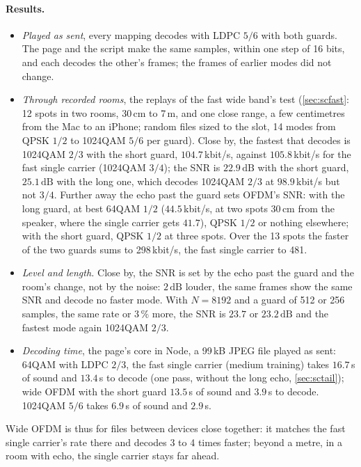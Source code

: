 \documentclass[11pt,a4paper]{article}
\newcommand{\dB}{\,\mathrm{dB}}
\theoremstyle{remark}
\begin{document}
\paragraph{Results.}
\begin{itemize}
\item \emph{Played as sent}, every mapping decodes with LDPC $5/6$ with both guards. The page and the script make the same samples, within one step of 16 bits, and each decodes the other's frames; the frames of earlier modes did not change.
\item \emph{Through recorded rooms}, the replays of the fast wide band's test (\cref{sec:scfast}: 12 spots in two rooms, 30\,cm to 7\,m, and one close range, a few centimetres from the Mac to an iPhone; random files sized to the slot, 14 modes from QPSK $1/2$ to 1024QAM $5/6$ per guard). Close by, the fastest that decodes is 1024QAM $2/3$ with the short guard, $104.7$\,kbit/s, against $105.8$\,kbit/s for the fast single carrier (1024QAM $3/4$); the SNR is $22.9\dB$ with the short guard, $25.1\dB$ with the long one, which decodes 1024QAM $2/3$ at $98.9$\,kbit/s but not $3/4$. Further away the echo past the guard sets OFDM's SNR: with the long guard, at best 64QAM $1/2$ ($44.5$\,kbit/s, at two spots 30\,cm from the speaker, where the single carrier gets $41.7$), QPSK $1/2$ or nothing elsewhere; with the short guard, QPSK $1/2$ at three spots. Over the 13 spots the faster of the two guards sums to 298\,kbit/s, the fast single carrier to 481.
\item \emph{Level and length.} Close by, the SNR is set by the echo past the guard and the room's change, not by the noise: $2\dB$ louder, the same frames show the same SNR and decode no faster mode. With $N = 8192$ and a guard of 512 or 256 samples, the same rate or $3\,\%$ more, the SNR is $23.7$ or $23.2\dB$ and the fastest mode again 1024QAM $2/3$.
\item \emph{Decoding time}, the page's core in Node, a 99\,kB JPEG file played as sent: 64QAM with LDPC $2/3$, the fast single carrier (medium training) takes $16.7$\,s of sound and $13.4$\,s to decode (one pass, without the long echo, \cref{sec:sctail}); wide OFDM with the short guard $13.5$\,s of sound and $3.9$\,s to decode. 1024QAM $5/6$ takes $6.9$\,s of sound and $2.9$\,s.
\end{itemize}
Wide OFDM is thus for files between devices close together: it matches the fast single carrier's rate there and decodes 3 to 4 times faster; beyond a metre, in a room with echo, the single carrier stays far ahead.
\end{document}
